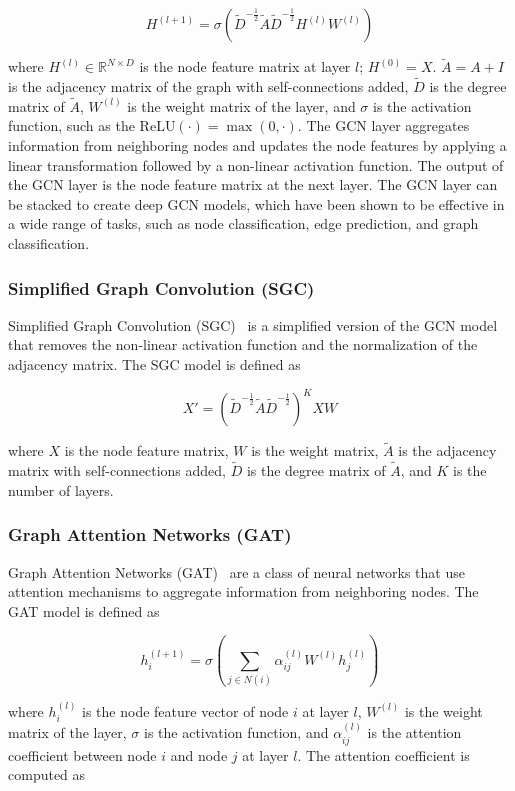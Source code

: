 \documentclass{article}
\begin{document}
$$ 
 H^{(l+1)} = \sigma(\tilde{D}^{-\frac{1}{2}}\tilde{A}\tilde{D}^{-\frac{1}{2}}H^{(l)}W^{(l)})
$$

where $H^{(l)}\in \mathbb{R}^{N\times D}$ is the node feature matrix at layer $l$; $H^{(0)} = X$. $\tilde{A} = A + I$ is the adjacency matrix of the graph with self-connections added, $\tilde{D}$ is the degree matrix of $\tilde{A}$, $W^{(l)}$ is the weight matrix of the layer, and $\sigma$ is the activation function, such as the $\text{ReLU}(\cdot)=\max(0,\cdot)$. The GCN layer aggregates information from neighboring nodes and updates the node features by applying a linear transformation followed by a non-linear activation function. The output of the GCN layer is the node feature matrix at the next layer. The GCN layer can be stacked to create deep GCN models, which have been shown to be effective in a wide range of tasks, such as node classification, edge prediction, and graph classification.


\subsubsection{Simplified Graph Convolution (SGC)}

Simplified Graph Convolution (SGC)~\cite{wu2019simplifying} is a simplified version of the GCN model that removes the non-linear activation function and the normalization of the adjacency matrix. The SGC model is defined as

$$
 X' = (\tilde{D}^{-\frac{1}{2}}\tilde{A}\tilde{D}^{-\frac{1}{2}})^K XW
$$

where $X$ is the node feature matrix, $W$ is the weight matrix, $\tilde{A}$ is the adjacency matrix with self-connections added, $\tilde{D}$ is the degree matrix of $\tilde{A}$, and $K$ is the number of layers. 


\subsubsection{Graph Attention Networks (GAT)}

Graph Attention Networks (GAT)~\cite{velickovic2020pointer} are a class of neural networks that use attention mechanisms to aggregate information from neighboring nodes. The GAT model is defined as

$$
    h_i^{(l+1)} = \sigma(\sum_{j\in N(i)}\alpha_{ij}^{(l)}W^{(l)}h_j^{(l)})
$$

where $h_i^{(l)}$ is the node feature vector of node $i$ at layer $l$, $W^{(l)}$ is the weight matrix of the layer, $\sigma$ is the activation function, and $\alpha_{ij}^{(l)}$ is the attention coefficient between node $i$ and node $j$ at layer $l$. The attention coefficient is computed as
\end{document}
